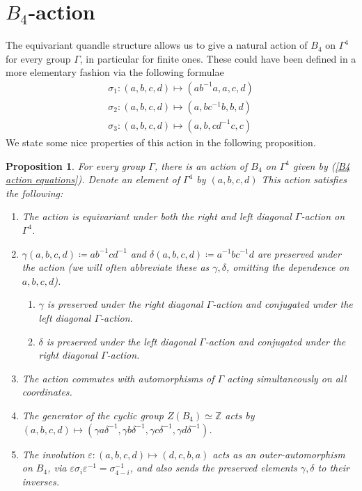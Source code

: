 \documentclass[letterpaper]{amsart}
\newtheorem{proposition}[theorem]{Proposition}
\begin{document}
\section{$B_4$-action}
The equivariant quandle structure allows us to give a natural action of $B_4$ on $\Gamma^4$ for every group $\Gamma$, in particular for finite ones. These could have been defined in a more elementary fashion via the following formulae
\begin{equation} \label{B4 action equations}
\begin{split}
\sigma_1:(a,b,c,d)\mapsto (ab^{-1}a, a, c, d) \\
\sigma_2:(a,b,c,d)\mapsto (a, bc^{-1}b, b, d) \\
\sigma_3:(a,b,c,d)\mapsto (a, b, cd^{-1}c, c)
\end{split}
\end{equation}
We state some nice properties of this action in the following proposition.
\begin{proposition}
\label{Basic Properties of the B4 Action}
    For every group $\Gamma$, there is an action of $B_4$ on $\Gamma^4$ given by (\ref{B4 action equations}). Denote an element of $\Gamma^4$ by $(a,b,c,d)$ This action satisfies the following:
    \begin{enumerate}
    \item The action is equivariant under both the right and left diagonal $\Gamma$-action on $\Gamma^4$.
    \item $\gamma(a,b,c,d) \coloneq ab^{-1}cd^{-1}$ and $\delta(a,b,c,d) \coloneq a^{-1}bc^{-1}d$ are preserved under the action (we will often abbreviate these as $\gamma,\delta$, omitting the dependence on $a,b,c,d$).
    \begin{enumerate}
        \item $\gamma$ is preserved under the right diagonal $\Gamma$-action and conjugated under the left diagonal $\Gamma$-action.
        \item $\delta$ is preserved under the left diagonal $\Gamma$-action and conjugated under the right diagonal $\Gamma$-action.
    \end{enumerate}
    \item The action commutes with automorphisms of $\Gamma$ acting simultaneously on all coordinates.
    \item The generator of the cyclic group $Z(B_4) \simeq \mathbb{Z}$ acts by $(a,b,c,d)\mapsto (\gamma a \delta^{-1}, \gamma b \delta^{-1}, \gamma c \delta^{-1}, \gamma d \delta^{-1})$.
    \item The involution $\varepsilon: (a,b,c,d) \mapsto (d, c, b, a)$ acts as an outer-automorphism on $B_4$, via $\varepsilon \sigma_i \varepsilon^{-1} = \sigma_{4 - i}^{-1}$, and also sends the preserved elements $\gamma,\delta$ to their inverses.
\end{enumerate}
\end{proposition}
\end{document}
